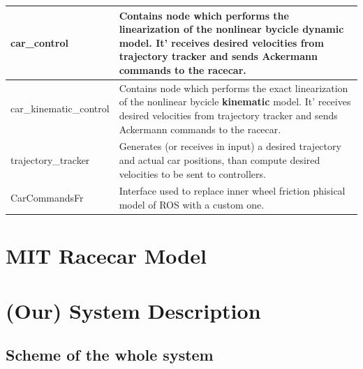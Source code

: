 \documentclass[12pt, letterpaper]{report}
\begin{document}
\begin{center}
	\begin{tabularx}{\textwidth}{
			| >{\raggedright\arraybackslash}X
			| >{\raggedright\arraybackslash}X |
		}
		\hline
		car\_control & Contains node which performs the linearization of the nonlinear bycicle \textbf{dynamic} model. It' receives desired velocities from trajectory tracker and sends Ackermann commands to the racecar. \\
		\hline
		car\_kinematic\_control & Contains node which performs the exact linearization of the nonlinear bycicle \textbf{kinematic} model. It' receives desired velocities from trajectory tracker and sends Ackermann commands to the racecar. \\
		\hline
		trajectory\_tracker & Generates (or receives in input) a desired trajectory and actual car positions, than compute desired velocities to be sent to controllers. \\
		\hline
		CarCommandsFr & Interface used to replace inner wheel friction phisical model of ROS with a custom one. \\
		\hline
	\end{tabularx}
\end{center}

\newpage
\chapter{MIT Racecar Model}


\newpage
\chapter{(Our) System Description}

\section{Scheme of the whole system}
\end{document}
